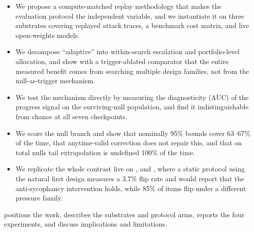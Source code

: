 \begin{itemize}[leftmargin=*,itemsep=0pt,topsep=2pt]
    \item We propose a compute-matched replay methodology that makes the evaluation protocol the
    independent variable, and we instantiate it on three substrates covering replayed attack
    traces, a benchmark cost matrix, and live open-weights models.
    \item We decompose ``adaptive'' into within-search escalation and portfolio-level allocation,
    and show with a trigger-ablated comparator that the entire measured benefit comes from
    searching multiple design families, not from the null-as-trigger mechanism.
    \item We test the mechanism directly by measuring the diagnosticity (AUC) of the progress
    signal on the surviving-null population, and find it indistinguishable from chance at all
    seven checkpoints.
    \item We score the null branch and show that nominally 95\% bounds cover 63--67\% of the
    time, that anytime-valid correction does not repair this, and that on total nulls tail
    extrapolation is undefined 100\% of the time.
    \item We replicate the whole contrast live on \qwenseven, \qwensmall and \phimini, where a
    static protocol using the natural first design measures a 3.7\% flip rate and would report
    that the anti-sycophancy intervention holds, while 85\% of items flip under a different
    pressure family.
\end{itemize}

 positions the work,  describes the substrates and
protocol arms,  reports the four experiments, and
 discuss implications and limitations.
